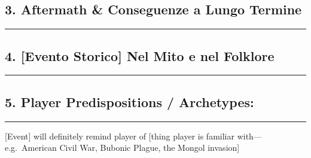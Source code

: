 \subsection{3. Aftermath \& Conseguenze a Lungo
Termine}\label{aftermath-conseguenze-a-lungo-termine}

\begin{center}\rule{0.5\linewidth}{0.5pt}\end{center}

\subsection{4. {[}Evento Storico{]} Nel Mito e nel
Folklore}\label{evento-storico-nel-mito-e-nel-folklore}

\begin{center}\rule{0.5\linewidth}{0.5pt}\end{center}

\subsection{5. Player Predispositions /
Archetypes:}\label{player-predispositions-archetypes}

\begin{center}\rule{0.5\linewidth}{0.5pt}\end{center}

{[}Event{]} will definitely remind player of {[}thing player is familiar
with---e.g.~American Civil War, Bubonic Plague, the Mongol invasion{]}
